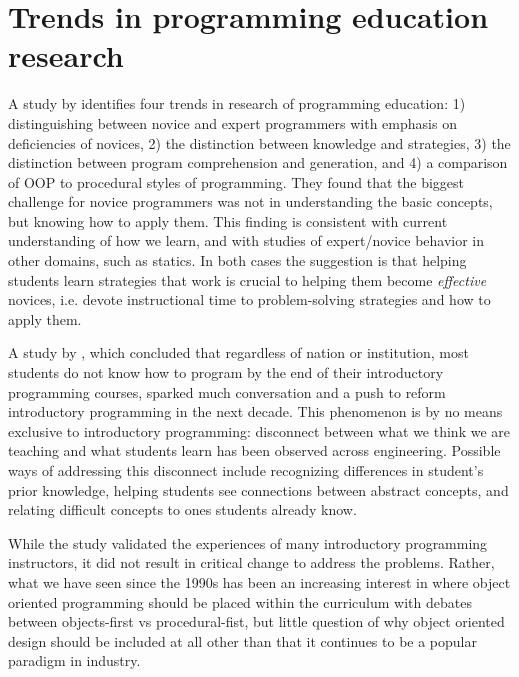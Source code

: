 \documentclass[12pt]{article}
\begin{document}
\section*{Trends in programming education research}
A \citeyear{robins_learning_2003} study by
\citeauthor{robins_learning_2003} identifies four trends in research
of programming education: 1) distinguishing between novice and expert
programmers with emphasis on deficiencies of novices, 2) the
distinction between knowledge and strategies, 3) the distinction
between program comprehension and generation, and 4) a comparison of
OOP to procedural styles of
programming\autocite{robins_learning_2003}. They found that the
biggest challenge for novice programmers was not in understanding the
basic concepts, but knowing how to apply them. This finding is
consistent with current understanding of how we
learn\autocite{bransford_how_2000,ambrose_chapter_2010}, and with
studies of expert/novice behavior in other domains, such as
statics\autocite{litzinger_cognitive_2010}. In both cases the
suggestion is that helping students learn strategies that work is
crucial to helping them become \emph{effective} novices, i.e. devote
instructional time to problem-solving strategies and how to apply
them.

A \citeyear{mccracken_multinational_2001} study by
\citeauthor{mccracken_multinational_2001}\autocite{mccracken_multinational_2001},
which concluded that regardless of nation or institution, most
students do not know how to program by the end of their introductory
programming courses, sparked much conversation and a push to reform
introductory programming in the next decade. This phenomenon is by no
means exclusive to introductory programming: disconnect between what
we think we are teaching and what students learn has been observed
across
engineering\autocite{streveler_learning_2008,flynn_engineering_2014}. Possible
ways of addressing this disconnect include recognizing differences in
student's prior knowledge, helping students see connections between
abstract concepts, and relating difficult concepts to ones students
already know\autocite{streveler_learning_2008,slotta_helping_2006}.

While the \citeauthor{mccracken_multinational_2001} study validated the
experiences of many introductory programming instructors, it did not
result in critical change to address the problems. Rather, what we
have seen since the 1990s has been an increasing interest in where
object oriented programming should be placed within the curriculum
with debates between objects-first vs procedural-fist, but little
question of why object oriented design should be included at all other
than that it continues to be a popular paradigm in industry.
\end{document}
